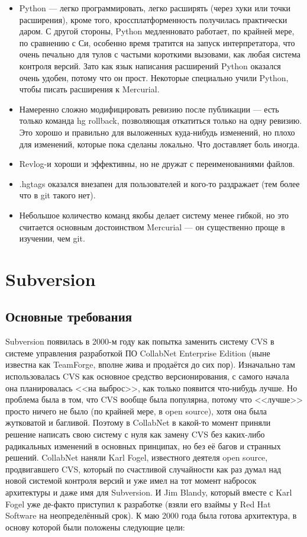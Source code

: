 \documentclass[a5paper]{article}
\begin{document}
\begin{itemize}
	\item Python --- легко программировать, легко расширять (через хуки или точки расширения), кроме того, кроссплатформенность получилась практически даром. С другой стороны, Python медленновато работает, по крайней мере, по сравнению с Си, особенно время тратится на запуск интерпретатора, что очень печально для тулов с частыми короткими вызовами, как любая система контроля версий. Зато как язык написания расширений Python оказался очень удобен, потому что он прост. Некоторые специально учили Python, чтобы писать расширения к Mercurial.
	\item Намеренно сложно модифицировать ревизию после публикации --- есть только команда hg rollback, позволяющая откатиться только на одну ревизию. Это хорошо и правильно для выложенных куда-нибудь изменений, но плохо для изменений, которые пока сделаны локально. Что доставляет боль иногда.
	\item Revlog-и хороши и эффективны, но не дружат с переименованиями файлов.
	\item .hgtags оказался внезапен для пользователей и кого-то раздражает (тем более что в git такого нет).
	\item Небольшое количество команд якобы делает систему менее гибкой, но это считается основным достоинством Mercurial --- он существенно проще в изучении, чем git.
\end{itemize}

\section{Subversion}

\subsection{Основные требования}

Subversion появилась в 2000-м году как попытка заменить систему CVS в системе управления разработкой ПО CollabNet Enterprise Edition (ныне известна как TeamForge, вполне жива и продаётся до сих пор). Изначально там использовалась CVS как основное средство версионирования, с самого начала она планировалась <<на выброс>>, как только появится что-нибудь лучше. Но проблема была в том, что CVS вообще была популярна, потому что <<лучше>> просто ничего не было (по крайней мере, в open source), хотя она была жутковатой и багливой. Поэтому в CollabNet в какой-то момент приняли решение написать свою систему с нуля как замену CVS без каких-либо радикальных изменений в основных принципах, но без её багов и странных решений. CollabNet наняли Karl Fogel, известного деятеля open source, продвигавшего CVS, который по счастливой случайности как раз думал над новой системой контроля версий и уже имел на тот момент набросок архитектуры и даже имя для Subversion. И Jim Blandy, который вместе с Karl Fogel уже де-факто приступил к разработке (взяли его взаймы у Red Hat Software на неопределённый срок). К маю 2000 года была готова архитектура, в основу которой были положены следующие цели:
\end{document}
